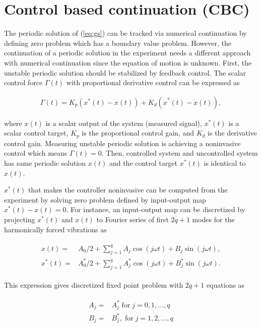 \documentclass[openacc]{rsproca_new}%
\theoremstyle{own}
\newcommand{\Eref}[1]{(\ref{#1})}
\begin{document}
\section{Control based continuation (CBC)}\label{CBC}

The periodic solution of \Eref{eq:gs} can be tracked via numerical continuation by defining zero problem which has a boundary value problem. However, the continuation of a periodic solution in the experiment needs a different approach with numerical continuation since the equation of motion is unknown. First, the unstable periodic solution should be stabilized by feedback control. The scalar control force $\Gamma(t)$ with proportional derivative control can be expressed as

\begin{align}
  \Gamma(t)=K_p(x^*(t)-x(t))+K_d(\dot x^*(t)-\dot x(t)),
\end{align}

\noindent where $x(t)$ is a scalar output of the system (measured signal), $x^*(t)$ is a scalar control target, $K_p$ is the proportional control gain, and $K_d$ is the derivative control gain. Measuring unstable periodic solution is achieving a noninvasive control which means $\Gamma(t)=0$. Then, controlled system and uncontrolled system has same periodic solution $x(t)$ and the control target $x^*(t)$ is identical to $x(t)$.

$x^*(t)$ that makes the controller noninvasive can be computed from the experiment by solving zero problem defined by input-output map $x^*(t)-x(t)=0$. For instance, an input-output map can be discretized by projecting $x^*(t)$ and $x(t)$ to Fourier series of first $2q+1$ modes for the harmonically forced vibrations as

\begin{align}\label{eq:dis}
  \begin{split}
  x(t)=&A_0/2+  \sum_{j=1}^{q} A_j \cos (j\omega t)+B_j \sin (j\omega t),\\
  x^*(t)=&A_0^*/2+  \sum_{j=1}^{q} A^*_j \cos (j\omega t)+B^*_j \sin (j\omega t).
\end{split}
\end{align}

\noindent This expression gives discretized fixed point problem with $2q+1$ equations as

\begin{align}\label{eq:zp}
  \begin{split}
  A_j=&A^*_j \; \textrm{for} \; j=0,1,\ldots,q\\
  B_j=&B^*_j,\; \textrm{for} \; j=1,2,\ldots,q
\end{split}
\end{align}
\end{document}
